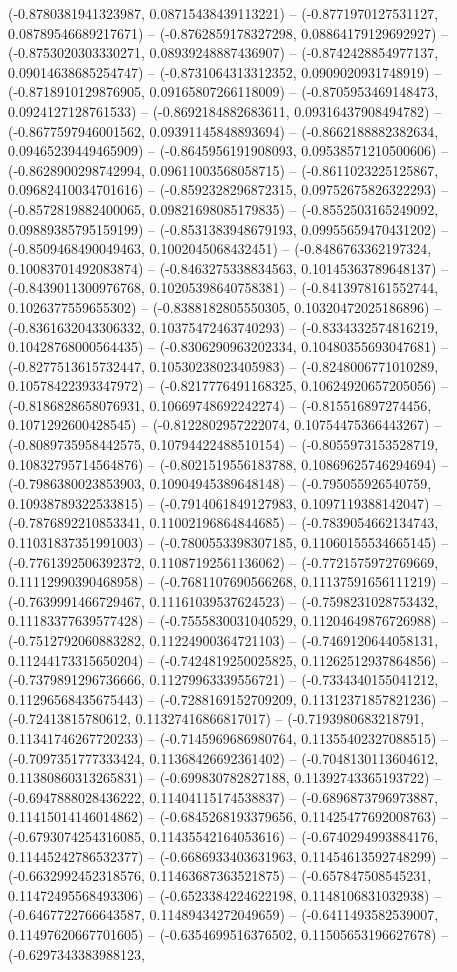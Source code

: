 (-0.8780381941323987, 0.08715438439113221) -- (-0.8771970127531127, 0.08789546689217671) -- (-0.8762859178327298, 0.08864179129692927) -- (-0.8753020303330271, 0.08939248887436907) -- (-0.8742428854977137, 0.09014638685254747) -- (-0.8731064313312352, 0.0909020931748919) -- (-0.8718910129876905, 0.09165807266118009) -- (-0.8705953469148473, 0.0924127128761533) -- (-0.8692184882683611, 0.09316437908494782) -- (-0.8677597946001562, 0.09391145848893694) -- (-0.8662188882382634, 0.09465239449465909) -- (-0.8645956191908093, 0.09538571210500606) -- (-0.8628900298742994, 0.09611003568058715) -- (-0.8611023225125867, 0.09682410034701616) -- (-0.8592328296872315, 0.09752675826322293) -- (-0.8572819882400065, 0.09821698085179835) -- (-0.8552503165249092, 0.09889385795159199) -- (-0.8531383948679193, 0.09955659470431202) -- (-0.8509468490049463, 0.1002045068432451) -- (-0.8486763362197324, 0.10083701492083874) -- (-0.8463275338834563, 0.10145363789648137) -- (-0.8439011300976768, 0.10205398640758381) -- (-0.8413978161552744, 0.1026377559655302) -- (-0.8388182805550305, 0.10320472025186896) -- (-0.8361632043306332, 0.10375472463740293) -- (-0.8334332574816219, 0.10428768000564435) -- (-0.8306290963202334, 0.10480355693047681) -- (-0.8277513615732447, 0.10530238023405983) -- (-0.8248006771010289, 0.10578422393347972) -- (-0.8217776491168325, 0.10624920657205056) -- (-0.8186828658076931, 0.10669748692242274) -- (-0.815516897274456, 0.1071292600428545) -- (-0.8122802957222074, 0.10754475366443267) -- (-0.8089735958442575, 0.10794422488510154) -- (-0.8055973153528719, 0.10832795714564876) -- (-0.8021519556183788, 0.10869625746294694) -- (-0.7986380023853903, 0.10904945389648148) -- (-0.795055926540759, 0.10938789322533815) -- (-0.7914061849127983, 0.1097119388142047) -- (-0.7876892210853341, 0.11002196864844685) -- (-0.7839054662134743, 0.11031837351991003) -- (-0.7800553398307185, 0.11060155534665145) -- (-0.7761392506392372, 0.11087192561136062) -- (-0.7721575972769669, 0.11112990390468958) -- (-0.7681107690566268, 0.11137591656111219) -- (-0.7639991466729467, 0.11161039537624523) -- (-0.7598231028753432, 0.11183377639577428) -- (-0.7555830031040529, 0.11204649876726988) -- (-0.7512792060883282, 0.11224900364721103) -- (-0.7469120644058131, 0.11244173315650204) -- (-0.7424819250025825, 0.11262512937864856) -- (-0.7379891296736666, 0.11279963339556721) -- (-0.7334340155041212, 0.11296568435675443) -- (-0.7288169152709209, 0.11312371857821236) -- (-0.72413815780612, 0.11327416866817017) -- (-0.7193980683218791, 0.11341746267720233) -- (-0.7145969686980764, 0.11355402327088515) -- (-0.7097351777333424, 0.11368426692361402) -- (-0.7048130113604612, 0.11380860313265831) -- (-0.699830782827188, 0.11392743365193722) -- (-0.6947888028436222, 0.11404115174538837) -- (-0.6896873796973887, 0.11415014146014862) -- (-0.6845268193379656, 0.11425477692008763) -- (-0.6793074254316085, 0.11435542164053616) -- (-0.6740294993884176, 0.11445242786532377) -- (-0.6686933403631963, 0.11454613592748299) -- (-0.6632992452318576, 0.11463687363521875) -- (-0.657847508545231, 0.11472495568493306) -- (-0.6523384224622198, 0.1148106831032938) -- (-0.6467722766643587, 0.11489434272049659) -- (-0.6411493582539007, 0.11497620667701605) -- (-0.6354699516376502, 0.11505653196627678) -- (-0.6297343383988123, 